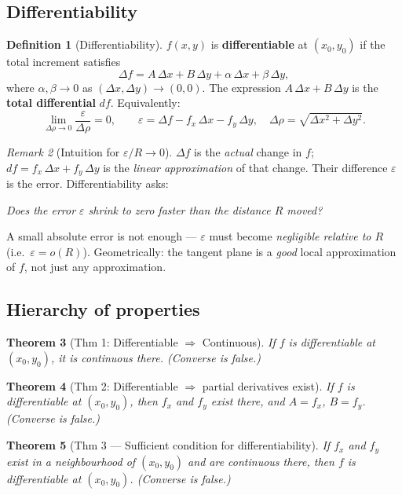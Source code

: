 \documentclass[12pt,a4paper]{article}
\newtheorem{theorem}{Theorem}[section]
\theoremstyle{definition}
\newtheorem{definition}[theorem]{Definition}
\theoremstyle{remark}
\newtheorem{remark}[theorem]{Remark}
\begin{document}
\subsection*{Differentiability}

\begin{definition}[Differentiability]
$f(x,y)$ is \textbf{differentiable} at $(x_0,y_0)$ if the total increment satisfies
\[
  \Delta f = A\,\Delta x + B\,\Delta y + \alpha\,\Delta x + \beta\,\Delta y,
\]
where $\alpha,\beta\to 0$ as $(\Delta x,\Delta y)\to(0,0)$.
The expression $A\,\Delta x+B\,\Delta y$ is the \textbf{total differential} $df$.
Equivalently:
\[
  \lim_{\Delta\rho\to 0}\frac{\varepsilon}{\Delta\rho} = 0,
  \qquad \varepsilon = \Delta f - f_x\,\Delta x - f_y\,\Delta y,\quad \Delta\rho=\sqrt{\Delta x^2+\Delta y^2}.
\]
\end{definition}

\begin{remark}[Intuition for $\varepsilon/R\to 0$]
$\Delta f$ is the \emph{actual} change in $f$; $df = f_x\,\Delta x+f_y\,\Delta y$ is the \emph{linear approximation} of that change.
Their difference $\varepsilon$ is the error. Differentiability asks:
\begin{center}
\emph{Does the error $\varepsilon$ shrink to zero faster than the distance $R$ moved?}
\end{center}
A small absolute error is not enough — $\varepsilon$ must become \emph{negligible relative to $R$} (i.e.\ $\varepsilon = o(R)$).
Geometrically: the tangent plane is a \emph{good} local approximation of $f$, not just any approximation.
\end{remark}

\subsection*{Hierarchy of properties}

\begin{theorem}[Thm 1: Differentiable $\Rightarrow$ Continuous]
If $f$ is differentiable at $(x_0,y_0)$, it is continuous there.
(\emph{Converse is false.})
\end{theorem}

\begin{theorem}[Thm 2: Differentiable $\Rightarrow$ partial derivatives exist]
If $f$ is differentiable at $(x_0,y_0)$, then $f_x$ and $f_y$ exist there, and $A=f_x$, $B=f_y$.
(\emph{Converse is false.})
\end{theorem}

\begin{theorem}[Thm 3 --- Sufficient condition for differentiability]
If $f_x$ and $f_y$ exist in a neighbourhood of $(x_0,y_0)$ and are \emph{continuous} there,
then $f$ is differentiable at $(x_0,y_0)$.
(\emph{Converse is false.})
\end{theorem}
\end{document}
